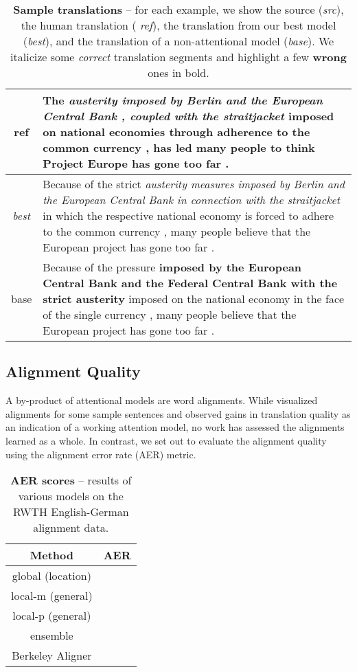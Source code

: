 \documentclass[11pt,a4paper]{article}
\newcommand{\correct}[1]{\textit{\color{blue} #1}}
\newcommand{\wrong}[1]{\textbf{\color{red} #1}}
\begin{document}
\begin{table*}[tbh!]
{\begin{tabular}{c|p{15cm}}
  \hline
ref & The \correct{austerity imposed by Berlin and the European Central Bank , coupled with the straitjacket} imposed on national economies through adherence to the common currency , has led many people to think Project Europe has gone too far .\\
  \hline
{\it best} & Because of the strict \correct{austerity measures imposed by Berlin
and the European Central Bank in connection with the straitjacket} in which the
respective national economy is forced to adhere to the common currency , many
people believe that the European project has gone too far . \\
  \hline
base & Because of the pressure \wrong{imposed by the European Central Bank and the Federal Central Bank with the strict austerity} imposed on the national economy in the face of the single currency , many people believe that the European project has gone too far .\\
\end{tabular}
}
\caption{{\bf Sample translations} -- for each example, we show the source ({\it src}), the human translation ({\it
ref}), the translation from our best model ({\it best}), and the
translation of a non-attentional model ({\it base}).  We italicize some
\correct{correct} translation segments and highlight a few \wrong{wrong} ones in
bold.} \label{t:sample}
\end{table*}

\subsection{Alignment Quality}
A by-product of attentional models are word alignments. While \cite{bog15}
visualized alignments for some sample sentences and 
observed gains in translation quality as an indication of a working attention
model, no work has assessed the alignments learned as a whole. In contrast, we
set out to evaluate the alignment quality using the alignment error rate (AER)
metric.

\begin{table}
  \begin{center}
    \begin{tabular}{c c}
      {\bf Method} & {\bf AER} \\
      \hline
      global (location) &  \\
      local-m (general)  &  \\
      local-p (general) &  \\
      \hdashline
      ensemble &  \\
      \hline
      Berkeley Aligner &  \\
    \end{tabular}
  \end{center}
  \caption{{\bf AER scores} -- results of various models on the RWTH
  English-German alignment data.}
  \label{t:alignment}
\end{table}
\end{document}

